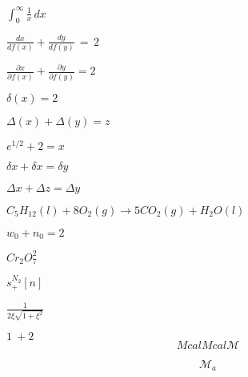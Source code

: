 \documentclass{article}
\begin{document}
$\int_0^{\infty} \frac{1}{x}\, dx$


$\frac{dx}{df(x)} + \frac{dy}{df(y)}\, =\, 2$


$\frac{\partial x}{\partial f(x)} + \frac{\partial y}{\partial f(y)} = 2$


$\delta (x) = 2$

$\Delta (x) + \Delta (y) = z$

$e^{1/2} + 2 = x$

$\delta x + \delta x = \delta y$

$\Delta x + \Delta z = \Delta y$

$C_5H_{12}(l)+8O_2(g)\rightarrow 5CO_2(g)+H_2O(l)$

$w_0 + n_0 = 2$

$Cr_2O_7^2$

$s^{N_2}_+ [n]$

$\frac{1}{2\xi \sqrt{1+\xi^2}}$

$1\: + 2$
\[
  Mcal Mcal \mathcal{M} 
\]

\[
  \mathcal{M}_{a}
\]
\end{document}
